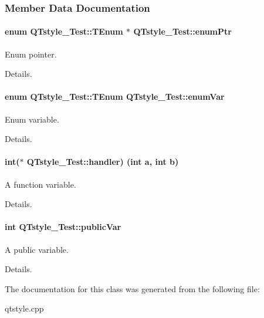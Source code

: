 \subsubsection{Member Data Documentation}
\paragraph[{\texorpdfstring{enum\+Ptr}{enumPtr}}]{\setlength{\rightskip}{0pt plus 5cm}enum {\bf Q\+Tstyle\+\_\+\+Test\+::\+T\+Enum}
         $\ast$ Q\+Tstyle\+\_\+\+Test\+::enum\+Ptr}\hypertarget{class_q_tstyle___test_a973a4566c9a036f4eca508ba5fe80dcb}{}\label{class_q_tstyle___test_a973a4566c9a036f4eca508ba5fe80dcb}


Enum pointer. 

Details. 
\paragraph[{\texorpdfstring{enum\+Var}{enumVar}}]{\setlength{\rightskip}{0pt plus 5cm}enum {\bf Q\+Tstyle\+\_\+\+Test\+::\+T\+Enum}
          Q\+Tstyle\+\_\+\+Test\+::enum\+Var}\hypertarget{class_q_tstyle___test_adb265d815b43f1f7f0de0e8b8852a5d0}{}\label{class_q_tstyle___test_adb265d815b43f1f7f0de0e8b8852a5d0}


Enum variable. 

Details. 
\paragraph[{\texorpdfstring{handler}{handler}}]{\setlength{\rightskip}{0pt plus 5cm}int($\ast$ Q\+Tstyle\+\_\+\+Test\+::handler) (int a, int b)}\hypertarget{class_q_tstyle___test_a79dd4e5498f09057775a819d911349e2}{}\label{class_q_tstyle___test_a79dd4e5498f09057775a819d911349e2}


A function variable. 

Details. 
\paragraph[{\texorpdfstring{public\+Var}{publicVar}}]{\setlength{\rightskip}{0pt plus 5cm}int Q\+Tstyle\+\_\+\+Test\+::public\+Var}\hypertarget{class_q_tstyle___test_aabf7b2e9ed83ea44aca4d213baae06d3}{}\label{class_q_tstyle___test_aabf7b2e9ed83ea44aca4d213baae06d3}


A public variable. 

Details. 

The documentation for this class was generated from the following file\+:\begin{DoxyCompactItemize}
\item 
qtstyle.\+cpp\end{DoxyCompactItemize}
